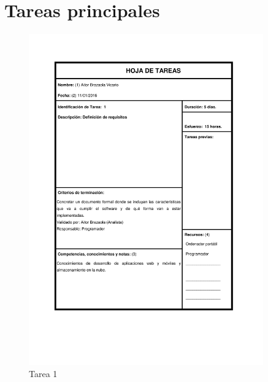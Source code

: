 \documentclass{DeustoFDP}
\begin{document}
\newpage
\section{Tareas principales}
\begin{figure}[H]
	\centering
	\includegraphics[width=0.9\textwidth]{fig/Tareas/1}
	\caption{Tarea 1}
	\label{fig:t1}
\end{figure}
\end{document}
